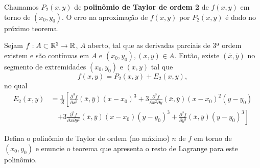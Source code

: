 Chamamos \(P_2(x,y)\) de \textbf{polinômio de Taylor de ordem 2} de \(f(x,y)\) em torno de \((x_0,y_0)\). O erro na aproximação de \(f(x,y)\) por \(P_2(x,y)\) é dado no próximo teorema.
\begin{theorem}
    Sejam \(f:A\subset\mathbb{R}^2\to\mathbb{R}\), \(A\) aberto, tal que as derivadas parciais de 3ª ordem existem e são contínuas em \(A\) e \((x_0,y_0),(x,y)\in A\). Então, existe \((\bar{x},\bar{y})\) no segmento de extremidades \((x_0,y_0)\) e \((x,y)\) tal que \[f(x,y) = P_2(x,y) + E_2(x,y),\] no qual
        \begin{align*}
            E_2(x,y)
                & = \frac{1}{3!} \left[ \frac{\partial^3 f}{\partial x^3}(\bar{x},\bar{y})(x-x_0)^3 + 3\frac{\partial^3 f}{\partial x^2 \partial y} (\bar{x},\bar{y})(x-x_0)^2(y-y_0) \right.\\
                    & \quad \left. + 3\frac{\partial^3 f}{\partial x\partial y^2}(\bar{x},\bar{y})(x-x_0)(y-y_0)^3 + \frac{\partial^3 f}{\partial y^3}(\bar{x},\bar{y})(y-y_0)^3 \right]
        \end{align*}
\end{theorem}

\begin{exercise}
    Defina o polinômio de Taylor de ordem (no máximo) \(n\) de \(f\) em torno de \((x_0,y_0)\) e enuncie o teorema que apresenta o resto de Lagrange para este polinômio.
\end{exercise}

